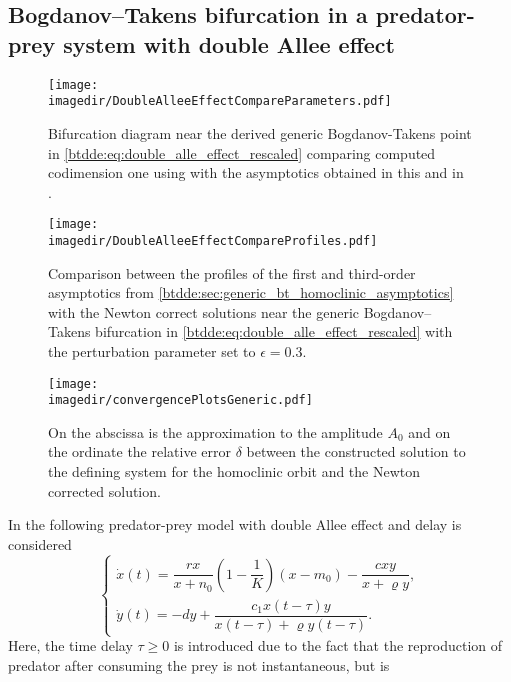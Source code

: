 \subsection{Bogdanov--Takens bifurcation in a predator-prey system with double Allee effect}
\label{btdde:sec:example:predator_prey}
\begin{figure}[ht!]
    \centering
    \texttt{[image: \\imagedir/DoubleAlleeEffectCompareParameters.pdf]}
    \caption{Bifurcation diagram near the derived generic Bogdanov-Takens point in
        \cref{btdde:eq:double_alle_effect_rescaled} comparing computed codimension one
        using \DDEBIFTOOL with the asymptotics obtained in this \paper{} and in \cite{Jiao2021}.}
    \label{btdde:fig:DoubleAlleeEffectCompareParameters}
\end{figure}
\begin{figure}[ht!]
    \centering
    \texttt{[image: \\imagedir/DoubleAlleeEffectCompareProfiles.pdf]}
    \caption{Comparison between the profiles of the first and third-order asymptotics from
    \cref{btdde:sec:generic_bt_homoclinic_asymptotics} with the Newton correct solutions near the generic
        Bogdanov--Takens bifurcation in \cref{btdde:eq:double_alle_effect_rescaled} with the
        perturbation parameter set to $\epsilon=0.3$.}
    \label{btdde:fig:DoubleAlleeEffectCompareProfiles}
\end{figure}
%
\begin{figure}[ht]
    \texttt{[image: \\imagedir/convergencePlotsGeneric.pdf]}
    \caption{On the abscissa is the approximation to the amplitude $A_0$ and on
        the ordinate the relative error $\delta$ between the constructed
        solution to the defining system
        \cite{connecting@2002} for the homoclinic orbit and the Newton
        corrected solution.}
    \label{btdde:fig:convergencePlotsGeneric}
\end{figure}
%
In \cite{Jiao2021} the following predator-prey model with double Allee effect and delay is considered
\begin{equation}
\label{btdde:eq:double_alle_effect}
\begin{cases}
    \dot x(t) = \dfrac{rx}{x+n_0}\left(1-\dfrac1 K\right)\left(x - m_0\right) - \dfrac{cxy}{x+\varrho y},\\
    \dot y(t) = -dy + \dfrac{c_1 x(t-\tau)y}{x(t-\tau) + \varrho y(t-\tau)}.
\end{cases}
\end{equation}
Here, the time delay $\tau \geq 0$ is introduced due to the fact that the
reproduction of predator after consuming the prey is not instantaneous, but is
